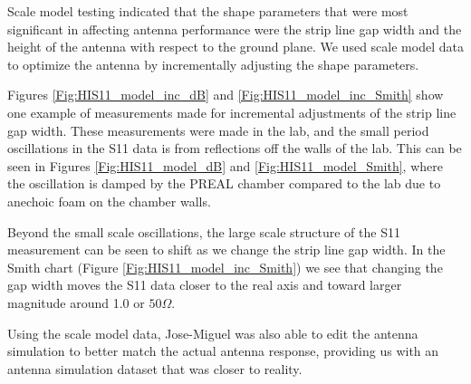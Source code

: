 Scale model testing indicated that the shape parameters that were most significant in affecting antenna performance were the strip line gap width and the height of the antenna with respect to the ground plane. We used scale model data to optimize the antenna by incrementally adjusting the shape parameters. 

Figures \ref{Fig:HIS11_model_inc_dB} and \ref{Fig:HIS11_model_inc_Smith} show one example of measurements made for incremental adjustments of the strip line gap width. These measurements were made in the lab, and the small period oscillations in the S11 data is from reflections off the walls of the lab. This can be seen in Figures \ref{Fig:HIS11_model_dB} and \ref{Fig:HIS11_model_Smith}, where the oscillation is damped by the PREAL chamber compared to the lab due to anechoic foam on the chamber walls. 

Beyond the small scale oscillations, the large scale structure of the S11 measurement can be seen to shift as we change the strip line gap width. In the Smith chart (Figure \ref{Fig:HIS11_model_inc_Smith}) we see that changing the gap width moves the S11 data closer to the real axis and toward larger magnitude around 1.0 or $50 \Omega$. 

Using the scale model data, Jose-Miguel was also able to edit the antenna simulation to better match the actual antenna response, providing us with an antenna simulation dataset that was closer to reality. 

